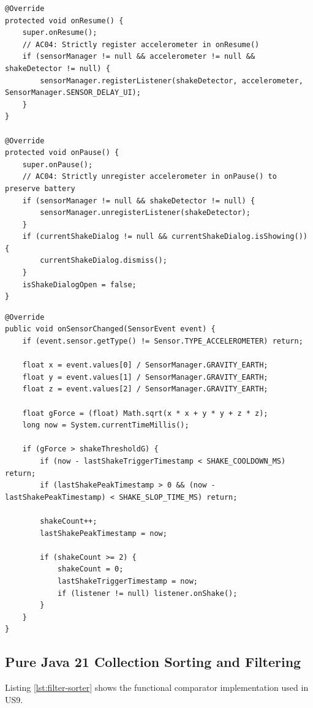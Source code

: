 \documentclass[runningheads,a4paper]{llncs}
\begin{document}
\begin{lstlisting}[style=javastyle,caption={Accelerometer Lifecycle Discipline (MainActivity.java)},label={lst:shake-lifecycle}]
@Override
protected void onResume() {
    super.onResume();
    // AC04: Strictly register accelerometer in onResume()
    if (sensorManager != null && accelerometer != null && shakeDetector != null) {
        sensorManager.registerListener(shakeDetector, accelerometer, SensorManager.SENSOR_DELAY_UI);
    }
}

@Override
protected void onPause() {
    super.onPause();
    // AC04: Strictly unregister accelerometer in onPause() to preserve battery
    if (sensorManager != null && shakeDetector != null) {
        sensorManager.unregisterListener(shakeDetector);
    }
    if (currentShakeDialog != null && currentShakeDialog.isShowing()) {
        currentShakeDialog.dismiss();
    }
    isShakeDialogOpen = false;
}
\end{lstlisting}

\begin{lstlisting}[style=javastyle,caption={Multi-Peak Shake Detection Algorithm (ShakeDetector.java)},label={lst:shake-detector}]
@Override
public void onSensorChanged(SensorEvent event) {
    if (event.sensor.getType() != Sensor.TYPE_ACCELEROMETER) return;

    float x = event.values[0] / SensorManager.GRAVITY_EARTH;
    float y = event.values[1] / SensorManager.GRAVITY_EARTH;
    float z = event.values[2] / SensorManager.GRAVITY_EARTH;

    float gForce = (float) Math.sqrt(x * x + y * y + z * z);
    long now = System.currentTimeMillis();

    if (gForce > shakeThresholdG) {
        if (now - lastShakeTriggerTimestamp < SHAKE_COOLDOWN_MS) return;
        if (lastShakePeakTimestamp > 0 && (now - lastShakePeakTimestamp) < SHAKE_SLOP_TIME_MS) return;

        shakeCount++;
        lastShakePeakTimestamp = now;

        if (shakeCount >= 2) {
            shakeCount = 0;
            lastShakeTriggerTimestamp = now;
            if (listener != null) listener.onShake();
        }
    }
}
\end{lstlisting}

\subsection{Pure Java 21 Collection Sorting and Filtering}
Listing \ref{lst:filter-sorter} shows the functional comparator implementation used in US9.
\end{document}
